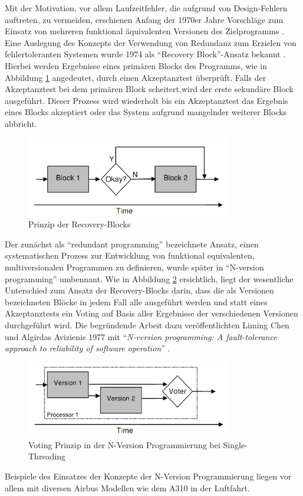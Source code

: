 %
Mit der Motivation, vor allem Laufzeitfehler, die aufgrund von Design-Fehlern auftreten, zu vermeiden, erschienen Anfang der 1970er Jahre Vorschläge zum Einsatz von mehreren funktional äquivalenten Versionen des Zielprogramms \cite{methodology}.
Eine Auslegung des Konzepts der Verwendung von Redundanz zum Erzielen von fehlertoleranten Systemen wurde 1974 als \enquote{Recovery Block}-Ansatz bekannt \cite{Horning:1974:PSE:647641.733522}.
Hierbei werden Ergebnisse eines primären Blocks des Programms, wie in Abbildung \ref{graph-recovery} angedeutet, durch einen Akzeptanztest überprüft.
Falls der Akzeptanztest bei dem primären Block scheitert,wird der erste sekundäre Block ausgeführt. Dieser Prozess wird wiederholt bis ein Akzeptanztest das Ergebnis eines Blocks akzeptiert oder das System aufgrund mangelnder weiterer Blocks abbricht.
%
%
\begin{figure}[ht]
	\centering
	\includegraphics[width=0.8\textwidth,natwidth=901,natheight=351]{grafiken/recovery-block.png}
	\caption{Prinzip der Recovery-Blocks \cite{lucent}}
	\label{graph-recovery}
\end{figure}
%
%
Der zunächst als \enquote{redundant programming} bezeichnete Ansatz, einen systematischen Prozess zur Entwicklung von funktional equivalenten, multiversionalen Programmen zu definieren, wurde später in \enquote{N-version programming} umbennant.
Wie in Abbildung \ref{graph-n-version-single} ersichtlich, liegt der wesentliche Unterschied zum Ansatz der Recovery-Blocks darin, dass die als Versionen bezeichneten Blöcke in jedem Fall alle ausgeführt werden und statt eines Akzeptanztests ein Voting auf Basis aller Ergebnisse der verschiedenen Versionen durchgeführt wird.
Die begründende Arbeit dazu veröffentlichten Liming Chen und Algirdas Avizienis 1977 mit \enquote{\emph{N-version programming: A fault-tolerance approach to reliability of software operation}} \cite{Chen1978}.
%
%
\begin{figure}[ht]
	\centering
	\includegraphics[width=0.8\textwidth,natwidth=901,natheight=333]{grafiken/single-thread-n-version.png}
	\caption{Voting Prinzip in der N-Version Programmierung bei Single-Threading \cite{lucent}}
	\label{graph-n-version-single}
\end{figure}
%
%
Beispiele des Einsatzes der Konzepte der N-Version Programmierung liegen vor allem mit diversen Airbus Modellen wie dem A310 in der Luftfahrt.
